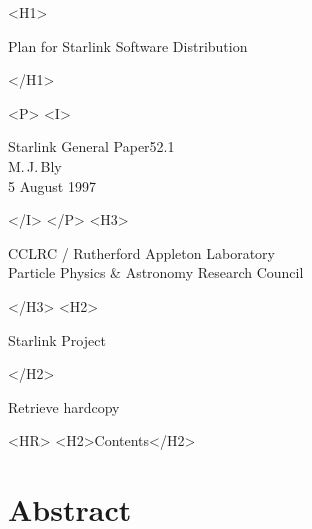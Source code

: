 \documentclass[twoside,11pt]{article}
\newcommand{\stardoccategory}  {Starlink General Paper}
\newcommand{\stardocsource}    {sgp\stardocnumber}
\newcommand{\stardocnumber}    {52.1}
\newcommand{\stardocauthors}   {M.\,J.\,Bly}
\newcommand{\stardocdate}      {5 August 1997}
\newcommand{\stardoctitle}     {Plan for Starlink Software Distribution}
\newcommand{\htmladdnormallink}[2]{#1}
\newcommand{\htmladdimg}[1]{}
\newcommand{\htmlref}[2]{#1}
\newcommand{\htmladdtonavigation}[1]{}
\newcommand{\xlabel}[1]{}
\newcommand{\latexonlytoc}[0]{\tableofcontents}
\begin{document}
\begin{htmlonly}
   \xlabel{}
   \begin{rawhtml} <H1> \end{rawhtml}
      \stardoctitle
   \begin{rawhtml} </H1> \end{rawhtml}


   \begin{rawhtml} <P> <I> \end{rawhtml}
   \stardoccategory \stardocnumber \\
   \stardocauthors \\
   \stardocdate
   \begin{rawhtml} </I> </P> <H3> \end{rawhtml}
      \htmladdnormallink{CCLRC}{http://www.cclrc.ac.uk} /
      \htmladdnormallink{Rutherford Appleton Laboratory}
                        {http://www.cclrc.ac.uk/ral} \\
      \htmladdnormallink{Particle Physics \& Astronomy Research Council}
                        {http://www.pparc.ac.uk} \\
   \begin{rawhtml} </H3> <H2> \end{rawhtml}
      \htmladdnormallink{Starlink Project}{http://star-www.rl.ac.uk/}
   \begin{rawhtml} </H2> \end{rawhtml}
   \htmladdnormallink{\htmladdimg{source.gif} Retrieve hardcopy}
      {http://star-www.rl.ac.uk/cgi-bin/hcserver?\stardocsource}\\

  \label{stardoccontents}
  \begin{rawhtml} 
    <HR>
    <H2>Contents</H2>
  \end{rawhtml}
  \renewcommand{\latexonlytoc}[0]{}
  \htmladdtonavigation{\htmlref{\htmladdimg{contents_motif.gif}}
        {stardoccontents}}

  \section{\xlabel{abstract}Abstract}

\end{htmlonly}
\end{document}
